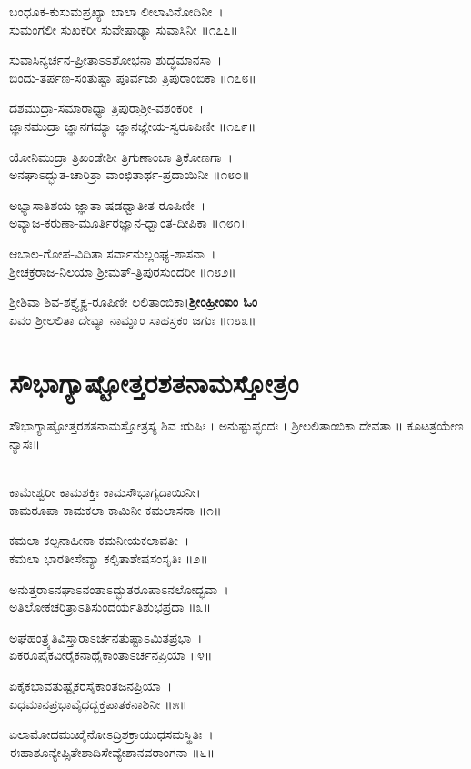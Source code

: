 ಬಂಧೂಕ-ಕುಸುಮಪ್ರಖ್ಯಾ ಬಾಲಾ ಲೀಲಾವಿನೋದಿನೀ~।\\
ಸುಮಂಗಲೀ ಸುಖಕರೀ ಸುವೇಷಾಢ್ಯಾ ಸುವಾಸಿನೀ ॥೧೭೭॥

ಸುವಾಸಿನ್ಯರ್ಚನ-ಪ್ರೀತಾಽಽಶೋಭನಾ ಶುದ್ಧಮಾನಸಾ~।\\
ಬಿಂದು-ತರ್ಪಣ-ಸಂತುಷ್ಟಾ ಪೂರ್ವಜಾ ತ್ರಿಪುರಾಂಬಿಕಾ ॥೧೭೮॥

ದಶಮುದ್ರಾ-ಸಮಾರಾಧ್ಯಾ ತ್ರಿಪುರಾಶ್ರೀ-ವಶಂಕರೀ~।\\
ಜ್ಞಾನಮುದ್ರಾ ಜ್ಞಾನಗಮ್ಯಾ ಜ್ಞಾನಜ್ಞೇಯ-ಸ್ವರೂಪಿಣೀ ॥೧೭೯॥

ಯೋನಿಮುದ್ರಾ ತ್ರಿಖಂಡೇಶೀ ತ್ರಿಗುಣಾಂಬಾ ತ್ರಿಕೋಣಗಾ~।\\
ಅನಘಾಽದ್ಭುತ-ಚಾರಿತ್ರಾ ವಾಂಛಿತಾರ್ಥ-ಪ್ರದಾಯಿನೀ ॥೧೮೦॥

ಅಭ್ಯಾಸಾತಿಶಯ-ಜ್ಞಾತಾ ಷಡಧ್ವಾತೀತ-ರೂಪಿಣೀ~।\\
ಅವ್ಯಾಜ-ಕರುಣಾ-ಮೂರ್ತಿರಜ್ಞಾನ-ಧ್ವಾಂತ-ದೀಪಿಕಾ ॥೧೮೧॥

ಆಬಾಲ-ಗೋಪ-ವಿದಿತಾ ಸರ್ವಾನುಲ್ಲಂಘ್ಯ-ಶಾಸನಾ~।\\
ಶ್ರೀಚಕ್ರರಾಜ-ನಿಲಯಾ ಶ್ರೀಮತ್-ತ್ರಿಪುರಸುಂದರೀ ॥೧೮೨॥

ಶ್ರೀಶಿವಾ ಶಿವ-ಶಕ್ತ್ಯೈಕ್ಯ-ರೂಪಿಣೀ ಲಲಿತಾಂಬಿಕಾ।{\bfseries ಶ್ರೀಂಹ್ರೀಂಐಂ ಓಂ}\\
ಏವಂ ಶ್ರೀಲಲಿತಾ ದೇವ್ಯಾ ನಾಮ್ನಾಂ ಸಾಹಸ್ರಕಂ ಜಗುಃ ॥೧೮೩॥
\section{ಸೌಭಾಗ್ಯಾಷ್ಟೋತ್ತರಶತನಾಮಸ್ತೋತ್ರಂ }
ಸೌಭಾಗ್ಯಾಷ್ಟೋತ್ತರಶತನಾಮಸ್ತೋತ್ರಸ್ಯ ಶಿವ ಋಷಿಃ । ಅನುಷ್ಟುಪ್ಛಂದಃ । ಶ್ರೀಲಲಿತಾಂಬಿಕಾ  ದೇವತಾ ॥ ಕೂಟತ್ರಯೇಣ ನ್ಯಾಸಃ॥

\\
ಕಾಮೇಶ್ವರೀ ಕಾಮಶಕ್ತಿಃ ಕಾಮಸೌಭಾಗ್ಯದಾಯಿನೀ।\\
ಕಾಮರೂಪಾ ಕಾಮಕಲಾ ಕಾಮಿನೀ ಕಮಲಾಸನಾ ॥೧॥

ಕಮಲಾ ಕಲ್ಪನಾಹೀನಾ ಕಮನೀಯಕಲಾವತೀ~।\\
ಕಮಲಾ ಭಾರತೀಸೇವ್ಯಾ ಕಲ್ಪಿತಾಶೇಷಸಂಸೃತಿಃ ॥೨॥

ಅನುತ್ತರಾಽನಘಾಽನಂತಾಽದ್ಭುತರೂಪಾಽನಲೋದ್ಭವಾ~।\\
ಅತಿಲೋಕಚರಿತ್ರಾಽತಿಸುಂದರ್ಯತಿಶುಭಪ್ರದಾ ॥೩॥

ಅಘಹಂತ್ರ್ಯತಿವಿಸ್ತಾರಾಽರ್ಚನತುಷ್ಟಾಽಮಿತಪ್ರಭಾ~।\\
ಏಕರೂಪೈಕವೀರೈಕನಾಥೈಕಾಂತಾಽರ್ಚನಪ್ರಿಯಾ ॥೪॥

ಏಕೈಕಭಾವತುಷ್ಟೈಕರಸೈಕಾಂತಜನಪ್ರಿಯಾ~।\\
ಏಧಮಾನಪ್ರಭಾವೈಧದ್ಭಕ್ತಪಾತಕನಾಶಿನೀ ॥೫॥

ಏಲಾಮೋದಮುಖೈನೋಽದ್ರಿಶಕ್ರಾಯುಧಸಮಸ್ಥಿತಿಃ~।\\
ಈಹಾಶೂನ್ಯೇಪ್ಸಿತೇಶಾದಿಸೇವ್ಯೇಶಾನವರಾಂಗನಾ ॥೬॥

